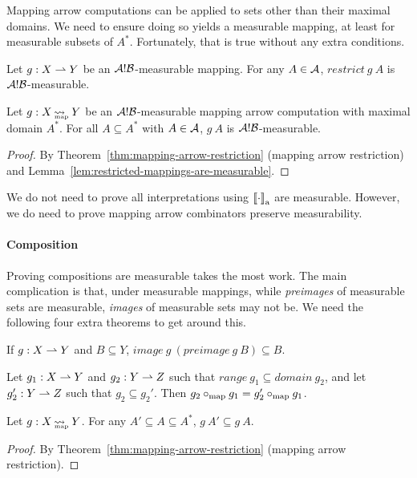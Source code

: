 Mapping arrow computations can be applied to sets other than their maximal domains.
We need to ensure doing so yields a measurable mapping, at least for measurable subsets of $A^*$.
Fortunately, that is true without any extra conditions.

\begin{lemma}
\label{lem:restricted-mappings-are-measurable}
Let $g : X \rightharpoonup Y$ be an $\mathcal{A}!\mathcal{B}$-measurable mapping.
For any $A \in \mathcal{A}$, $restrict~g~A$ is $\mathcal{A}!\mathcal{B}$-measurable.%
\end{lemma}

\begin{theorem}
\label{thm:restricted-computations-are-measurable}
Let $g : X \operatorname{\rightsquigarrow_{\mspace{-21mu}_\mathrm{map}}} Y$ be an $\mathcal{A}!\mathcal{B}$-measurable mapping arrow computation with maximal domain $A^*$.
For all $A \subseteq A^*$ with $A \in \mathcal{A}$, $g~A$ is $\mathcal{A}!\mathcal{B}$-measurable.
\end{theorem}
\begin{proof}
By Theorem~\ref{thm:mapping-arrow-restriction} (mapping arrow restriction) and Lemma~\ref{lem:restricted-mappings-are-measurable}.
\end{proof}

We do not need to prove all interpretations using $\left\llbracket{\cdot}\right\rrbracket_\mathrm{a}$ are measurable.
However, we do need to prove mapping arrow combinators preserve measurability.

\paragraph{Composition}
Proving compositions are measurable takes the most work.
The main complication is that, under measurable mappings, while \emph{preimages} of measurable sets are measurable, \emph{images} of measurable sets may not be.
We need the following four extra theorems to get around this.

\begin{lemma}
\label{lem:images-of-preimages}
If $g : X \rightharpoonup Y$ and $B \subseteq Y$, $image~g~(preimage~g~B) \subseteq B$.%
\end{lemma}

\begin{lemma}
\label{lem:composition-expansion}
Let $g_1 : X \rightharpoonup Y$ and $g_2 : Y \rightharpoonup Z$ such that $range~g_1 \subseteq domain~g_2$, and let $g_2' : Y \rightharpoonup Z$ such that $g_2 \subseteq g_2'$.
Then $g_2 \circ_\mathrm{map} g_1 = g_2' \circ_\mathrm{map} g_1$.%
\end{lemma}

\begin{theorem}
\label{thm:mapping-arrow-monotonicity}
Let $g : X \operatorname{\rightsquigarrow_{\mspace{-21mu}_\mathrm{map}}} Y$.
For any $A' \subseteq A \subseteq A^*$, $g~A' \subseteq g~A$.%
\end{theorem}
\begin{proof}
By Theorem~\ref{thm:mapping-arrow-restriction} (mapping arrow restriction).
\end{proof}


